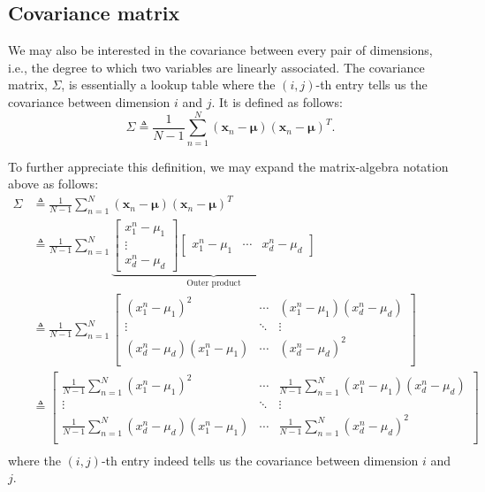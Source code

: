 \documentclass{article}
\newcommand{\vecx}{\boldsymbol{x}}
\begin{document}
\subsection{Covariance matrix}

We may also be interested in the covariance between every pair of dimensions, i.e., the degree to which two variables are linearly associated. The covariance matrix, $\Sigma$, is essentially a lookup table where the $(i, j)$-th entry tells us the covariance between dimension $i$ and $j$. It is defined as follows:
$$\Sigma \triangleq \frac{1}{N-1} \sum_{n=1}^N (\vecx_n - \boldsymbol{\mu})(\vecx_n - \boldsymbol{\mu})^T.$$ 

To further appreciate this definition, we may expand the matrix-algebra notation above as follows:
\begin{align*}
\Sigma & \triangleq \frac{1}{N-1} \sum_{n=1}^N (\vecx_n - \boldsymbol{\mu})(\vecx_n - \boldsymbol{\mu})^T \\
&\triangleq   \frac{1}{N-1} \sum_{n=1}^N
\underbrace{
	\begin{bmatrix}
		x^n_1 - \mu_1 \\
		\vdots \\
		x^n_d - \mu_d
	\end{bmatrix}
	\begin{bmatrix}
		x^n_1 - \mu_1 & \cdots & x^n_d - \mu_d
	\end{bmatrix}
}_{\text{Outer product}} \\
&\triangleq  \frac{1}{N-1} \sum_{n=1}^N
\begin{bmatrix}
(x^n_1 - \mu_1)^2 & \cdots & (x^n_1 - \mu_1)(x^n_d - \mu_d) \\
\vdots & \ddots & \vdots \\
(x^n_d - \mu_d)(x^n_1 - \mu_1) & \cdots & (x^n_d - \mu_d)^2 \\
\end{bmatrix} \\
&\triangleq \begin{bmatrix}
	\frac{1}{N-1} \sum_{n=1}^N(x^n_1 - \mu_1)^2 & \cdots & \frac{1}{N-1} \sum_{n=1}^N(x^n_1 - \mu_1)(x^n_d - \mu_d) \\
	\vdots & \ddots & \vdots \\
	\frac{1}{N-1} \sum_{n=1}^N(x^n_d - \mu_d)(x^n_1 - \mu_1) & \cdots & \frac{1}{N-1} \sum_{n=1}^N(x^n_d - \mu_d)^2 \\
\end{bmatrix} \\
\end{align*}
where the $(i, j)$-th entry indeed tells us the covariance between dimension $i$ and $j$.
\end{document}
